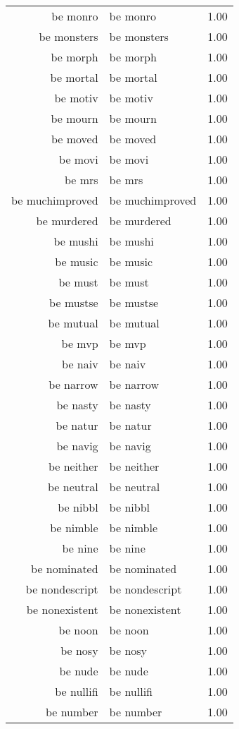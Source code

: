 \begin{table}[ht]
\begin{tabular}{rlr}
  be monro & be monro & 1.00 \\ 
  be monsters & be monsters & 1.00 \\ 
  be morph & be morph & 1.00 \\ 
  be mortal & be mortal & 1.00 \\ 
  be motiv & be motiv & 1.00 \\ 
  be mourn & be mourn & 1.00 \\ 
  be moved & be moved & 1.00 \\ 
  be movi & be movi & 1.00 \\ 
  be mrs & be mrs & 1.00 \\ 
  be muchimproved & be muchimproved & 1.00 \\ 
  be murdered & be murdered & 1.00 \\ 
  be mushi & be mushi & 1.00 \\ 
  be music & be music & 1.00 \\ 
  be must & be must & 1.00 \\ 
  be mustse & be mustse & 1.00 \\ 
  be mutual & be mutual & 1.00 \\ 
  be mvp & be mvp & 1.00 \\ 
  be naiv & be naiv & 1.00 \\ 
  be narrow & be narrow & 1.00 \\ 
  be nasty & be nasty & 1.00 \\ 
  be natur & be natur & 1.00 \\ 
  be navig & be navig & 1.00 \\ 
  be neither & be neither & 1.00 \\ 
  be neutral & be neutral & 1.00 \\ 
  be nibbl & be nibbl & 1.00 \\ 
  be nimble & be nimble & 1.00 \\ 
  be nine & be nine & 1.00 \\ 
  be nominated & be nominated & 1.00 \\ 
  be nondescript & be nondescript & 1.00 \\ 
  be nonexistent & be nonexistent & 1.00 \\ 
  be noon & be noon & 1.00 \\ 
  be nosy & be nosy & 1.00 \\ 
  be nude & be nude & 1.00 \\ 
  be nullifi & be nullifi & 1.00 \\ 
  be number & be number & 1.00 \\ 

\end{tabular}
\end{table}

